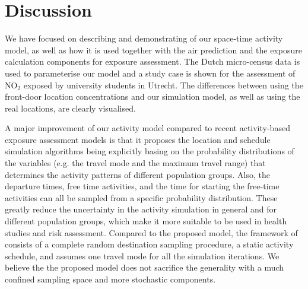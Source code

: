 \documentclass[]{article}
\begin{document}
 

\section{Discussion}
\label{sec:dis}





We have focused on describing and demonstrating of our space-time activity model, as well as how it is used together with the air prediction and the exposure calculation components for exposure assessment. The Dutch micro-census data is used to parameterise our model and a study case is shown for the assessment of NO$_2$ exposed by university students in Utrecht. The differences between using the front-door location concentrations and our simulation model, as well as using the real locations, are clearly visualised. 

A major improvement of our activity model compared to recent activity-based exposure assessment models \citep{lu2019activity} is that it proposes the location and schedule simulation algorithms being explicitly basing on the probability distributions of the variables (e.g. the travel mode and the maximum travel range) that determines the activity patterns of different population groups. Also, the departure times, free time activities, and the time for starting the free-time activities can all be sampled from a specific probability distribution. These greatly reduce the uncertainty in the activity simulation in general and for different population groups, which make it more suitable to be used in health studies and risk assessment. Compared to the proposed model, the framework of \citep{lu2019activity} consists of a complete random destination sampling procedure, a static activity schedule, and assumes one travel mode for all the simulation iterations. We believe the the proposed model does not sacrifice the generality with a much confined sampling space and more stochastic components. 


\end{document}
